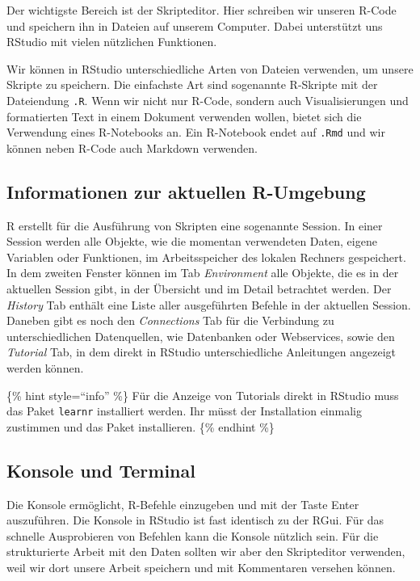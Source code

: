 \documentclass[
]{book}
\begin{document}
Der wichtigste Bereich ist der Skripteditor. Hier schreiben wir unseren R-Code und speichern ihn in Dateien auf unserem Computer. Dabei unterstützt uns RStudio mit vielen nützlichen Funktionen.

Wir können in RStudio unterschiedliche Arten von Dateien verwenden, um unsere Skripte zu speichern. Die einfachste Art sind sogenannte R-Skripte mit der Dateiendung \texttt{.R}. Wenn wir nicht nur R-Code, sondern auch Visualisierungen und formatierten Text in einem Dokument verwenden wollen, bietet sich die Verwendung eines R-Notebooks an. Ein R-Notebook endet auf \texttt{.Rmd} und wir können neben R-Code auch Markdown verwenden.

\hypertarget{informationen-zur-aktuellen-r-umgebung}{%
\subsection{Informationen zur aktuellen R-Umgebung}\label{informationen-zur-aktuellen-r-umgebung}}

R erstellt für die Ausführung von Skripten eine sogenannte Session. In einer Session werden alle Objekte, wie die momentan verwendeten Daten, eigene Variablen oder Funktionen, im Arbeitsspeicher des lokalen Rechners gespeichert. In dem zweiten Fenster können im Tab \emph{Environment} alle Objekte, die es in der aktuellen Session gibt, in der Übersicht und im Detail betrachtet werden. Der \emph{History} Tab enthält eine Liste aller ausgeführten Befehle in der aktuellen Session. Daneben gibt es noch den \emph{Connections} Tab für die Verbindung zu unterschiedlichen Datenquellen, wie Datenbanken oder Webservices, sowie den \emph{Tutorial} Tab, in dem direkt in RStudio unterschiedliche Anleitungen angezeigt werden können.

\{\% hint style=``info'' \%\}
Für die Anzeige von Tutorials direkt in RStudio muss das Paket \texttt{learnr} installiert werden. Ihr müsst der Installation einmalig zustimmen und das Paket installieren.
\{\% endhint \%\}

\hypertarget{konsole-und-terminal}{%
\subsection{Konsole und Terminal}\label{konsole-und-terminal}}

Die Konsole ermöglicht, R-Befehle einzugeben und mit der Taste Enter auszuführen. Die Konsole in RStudio ist fast identisch zu der RGui. Für das schnelle Ausprobieren von Befehlen kann die Konsole nützlich sein. Für die strukturierte Arbeit mit den Daten sollten wir aber den Skripteditor verwenden, weil wir dort unsere Arbeit speichern und mit Kommentaren versehen können.
\end{document}
